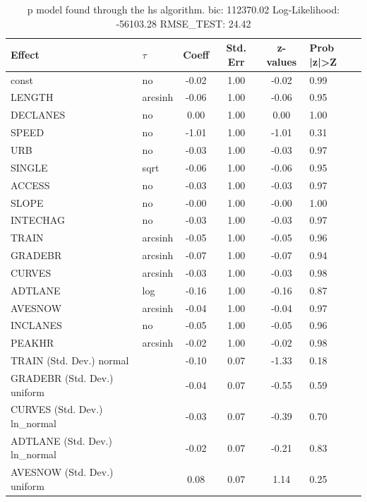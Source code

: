 \begin{table}
	\caption{p model found through the hs algorithm. bic: 112370.02 Log-Likelihood: -56103.28 RMSE_TEST: 24.42}
	\begin{center}
		\begin{tabular}{|l|l|c|c|c|l|}
			\hline
			Effect & $\tau$ & Coeff & Std. Err & z-values & Prob |z|>Z \\
			\hline
			const & no & -0.02 & 1.00 & -0.02 & 0.99 \\
			\hline
			LENGTH & arcsinh & -0.06 & 1.00 & -0.06 & 0.95 \\
			\hline
			DECLANES & no & 0.00 & 1.00 & 0.00 & 1.00 \\
			\hline
			SPEED & no & -1.01 & 1.00 & -1.01 & 0.31 \\
			\hline
			URB & no & -0.03 & 1.00 & -0.03 & 0.97 \\
			\hline
			SINGLE & sqrt & -0.06 & 1.00 & -0.06 & 0.95 \\
			\hline
			ACCESS & no & -0.03 & 1.00 & -0.03 & 0.97 \\
			\hline
			SLOPE & no & -0.00 & 1.00 & -0.00 & 1.00 \\
			\hline
			INTECHAG & no & -0.03 & 1.00 & -0.03 & 0.97 \\
			\hline
			TRAIN & arcsinh & -0.05 & 1.00 & -0.05 & 0.96 \\
			\hline
			GRADEBR & arcsinh & -0.07 & 1.00 & -0.07 & 0.94 \\
			\hline
			CURVES & arcsinh & -0.03 & 1.00 & -0.03 & 0.98 \\
			\hline
			ADTLANE & log & -0.16 & 1.00 & -0.16 & 0.87 \\
			\hline
			AVESNOW & arcsinh & -0.04 & 1.00 & -0.04 & 0.97 \\
			\hline
			INCLANES & no & -0.05 & 1.00 & -0.05 & 0.96 \\
			\hline
			PEAKHR & arcsinh & -0.02 & 1.00 & -0.02 & 0.98 \\
			\hline
			TRAIN (Std. Dev.) normal &  & -0.10 & 0.07 & -1.33 & 0.18 \\
			\hline
			GRADEBR (Std. Dev.) uniform &  & -0.04 & 0.07 & -0.55 & 0.59 \\
			\hline
			CURVES (Std. Dev.) ln_normal &  & -0.03 & 0.07 & -0.39 & 0.70 \\
			\hline
			ADTLANE (Std. Dev.) ln_normal &  & -0.02 & 0.07 & -0.21 & 0.83 \\
			\hline
			AVESNOW (Std. Dev.) uniform &  & 0.08 & 0.07 & 1.14 & 0.25 \\
			\hline

\end{tabular}
\end{center}
\end{table}
